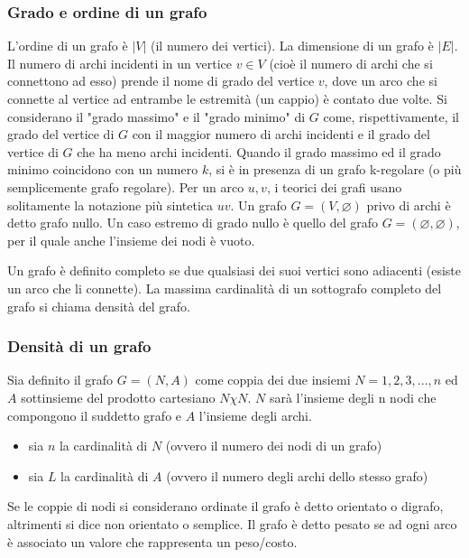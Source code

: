 \subsubsection{Grado e ordine di un grafo}

L'ordine di un grafo \cite{GrafoOrdine} è $|V|$ (il numero dei vertici). La dimensione di un grafo è $|E|$. Il numero di archi incidenti in un vertice $v \in V$ (cioè il numero di archi che si connettono ad esso) prende il nome di grado del vertice $v$, dove un arco che si connette al vertice ad entrambe le estremità (un cappio) è contato due volte.
Si considerano il "grado massimo" e il "grado minimo" di $G$ come, rispettivamente, il grado del vertice di $G$ con il maggior numero di archi incidenti e il grado del vertice di $G$ che ha meno archi incidenti. Quando il grado massimo ed il grado minimo coincidono con un numero $k$, si è in presenza di un grafo k-regolare (o più semplicemente grafo regolare).
Per un arco ${u, v}$, i teorici dei grafi usano solitamente la notazione più sintetica $uv$.
Un grafo $G=(V,\varnothing)$ privo di archi è detto grafo nullo. Un caso estremo di grado nullo è quello del grafo $G=(\varnothing,\varnothing)$, per il quale anche l'insieme dei nodi è vuoto.

Un grafo è definito completo se due qualsiasi dei suoi vertici sono adiacenti (esiste un arco che li connette). La massima cardinalità di un sottografo completo del grafo si chiama densità del grafo.

\subsubsection{Densità di un grafo}

Sia definito il grafo $G=(N,A)$ come coppia dei due insiemi $N={1,2,3,...,n}$ ed $A$ sottinsieme del prodotto cartesiano $N \chi N$. $N$ sarà l'insieme degli n nodi che compongono il suddetto grafo e $A$ l'insieme degli archi.
\begin{itemize}
    \item sia $n$ la cardinalità di $N$ (ovvero il numero dei nodi di un grafo)
    \item sia $L$ la cardinalità di $A$ (ovvero il numero degli archi dello stesso grafo)
\end{itemize}
Se le coppie di nodi si considerano ordinate il grafo è detto orientato o digrafo, altrimenti si dice non orientato o semplice. Il grafo è detto pesato se ad ogni arco è associato un valore che rappresenta un peso/costo.

